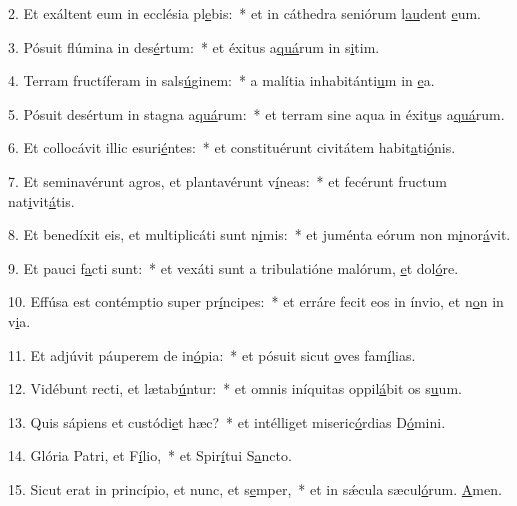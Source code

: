 2. Et exáltent eum in ecclésia pl\uline{e}bis:~* et in cáthedra seniórum l\uline{au}dent \uline{e}um.\par 
3. Pósuit flúmina in des\uline{é}rtum:~* et éxitus a\uline{quá}rum in s\uline{i}tim.\par 
4. Terram fructíferam in sals\uline{ú}ginem:~* a malítia inhabitánti\uline{u}m in \uline{e}a.\par 
5. Pósuit desértum in stagna a\uline{quá}rum:~* et terram sine aqua in éxit\uline{u}s a\uline{quá}rum.\par 
6. Et collocávit illic esuri\uline{é}ntes:~* et constituérunt civitátem habit\uline{a}ti\uline{ó}nis.\par 
7. Et seminavérunt agros, et plantavérunt v\uline{í}neas:~* et fecérunt fructum nat\uline{i}vit\uline{á}tis.\par 
8. Et benedíxit eis, et multiplicáti sunt n\uline{i}mis:~* et juménta eórum non m\uline{i}nor\uline{á}vit.\par 
9. Et pauci f\uline{a}cti sunt:~* et vexáti sunt a tribulatióne malórum, \uline{e}t dol\uline{ó}re.\par 
10. Effúsa est contémptio super pr\uline{í}ncipes:~* et erráre fecit eos in ínvio, et n\uline{o}n in v\uline{i}a.\par 
11. Et adjúvit páuperem de in\uline{ó}pia:~* et pósuit sicut \uline{o}ves fam\uline{í}lias.\par 
12. Vidébunt recti, et lætab\uline{ú}ntur:~* et omnis iníquitas oppil\uline{á}bit os s\uline{u}um.\par 
13. Quis sápiens et custódi\uline{e}t hæc?~* et intélliget miseric\uline{ó}rdias D\uline{ó}mini.\par 
14. Glória Patri, et F\uline{í}lio,~* et Spir\uline{í}tui S\uline{a}ncto.\par 
15. Sicut erat in princípio, et nunc, et s\uline{e}mper,~* et in sǽcula sæcul\uline{ó}rum. \uline{A}men.\par 

